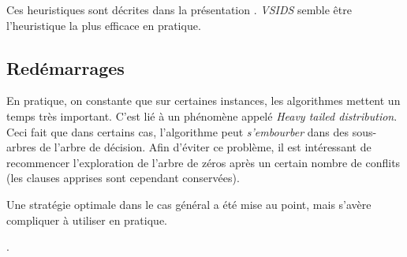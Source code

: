 Ces heuristiques sont décrites dans la présentation \cite{heuriSAT}.
\emph{VSIDS} semble être l'heuristique la plus efficace en pratique\cite{VSIDS}.

\subsection{Redémarrages}\label{restart}
En pratique, on constante que sur certaines instances, les algorithmes mettent
un temps très important. C'est lié à un phénomène appelé \emph{Heavy tailed
distribution}. 
Ceci fait que dans certains cas, l'algorithme peut \emph{s'embourber} dans des
sous-arbres de l'arbre de décision. Afin d'éviter ce problème, il est
intéressant de recommencer l'exploration de l'arbre de zéros après un certain
nombre de conflits (les clauses apprises sont cependant conservées).

Une stratégie optimale dans le cas général a été mise au point\cite{luby93},
mais s'avère compliquer à utiliser en pratique.

.

